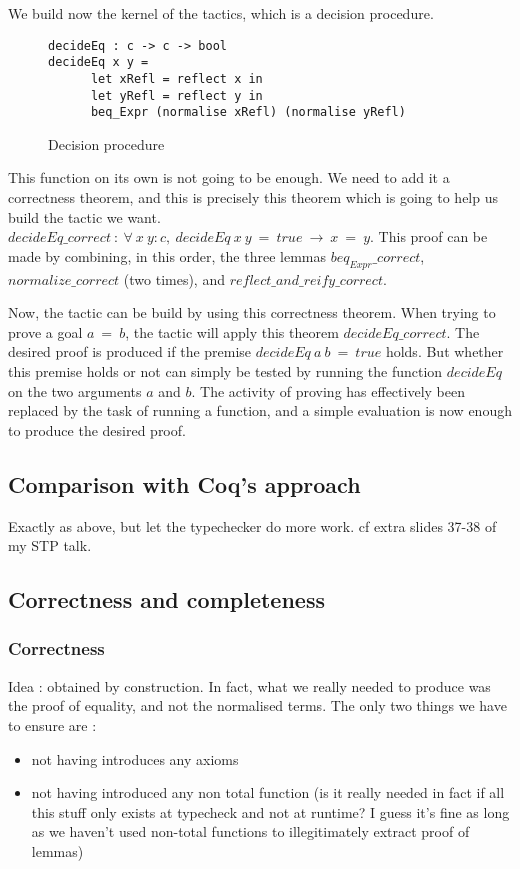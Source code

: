 We build now the kernel of the tactics, which is a decision procedure. 
\begin{figure}[H]
\figrule
\begin{center}
\begin{verbatim}
decideEq : c -> c -> bool 
decideEq x y =
      let xRefl = reflect x in 
      let yRefl = reflect y in
      beq_Expr (normalise xRefl) (normalise yRefl)
\end{verbatim}
\end{center}
\caption{Decision procedure}
\figrule
\end{figure}
This function on its own is not going to be enough. We need to add it a correctness theorem, and this is precisely this theorem which is going to help us build the tactic we want.	
$decideEq\_correct\ :\ \forall\  x\ y:c,\ decideEq\ x\ y\ =\ true\ \rightarrow\ x\ =\ y$. This proof can be made by combining, in this order, the three lemmas $beq_{Expr}\_correct$, $normalize\_correct$ (two times), and $reflect\_and\_reify\_correct$.

Now, the tactic can be build by using this correctness theorem. When trying to prove a goal $a\ =\ b$, the tactic will apply this theorem $decideEq\_correct$. The desired proof is produced if the premise $decideEq\ a\ b\ =\ true$ holds. But whether this premise holds or not can simply be tested by running the function $decideEq$ on the two arguments $a$ and $b$. The activity of proving has effectively been replaced by the task of running a function, and a simple evaluation is now enough to produce the desired proof.

	\subsection {Comparison with Coq's approach}
	
Exactly as above, but let the typechecker do more work.
cf extra slides 37-38 of my STP talk.

	\subsection {Correctness and completeness}

		\subsubsection{Correctness}
		
Idea : obtained by construction. In fact, what we really needed to produce was the proof of equality, and not the normalised terms. The only two things we have to ensure are :
\begin{itemize}
\item not having introduces any axioms
\item not having introduced any non total function (is it really needed in fact if all this stuff only exists at typecheck and not at runtime? I guess it's fine as long as we haven't used non-total functions to illegitimately extract proof of lemmas)
\end{itemize}

